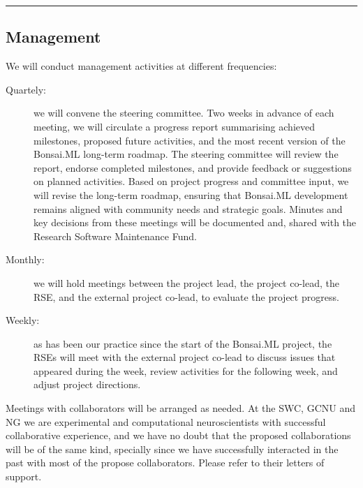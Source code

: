 \noindent\rule{\textwidth}{1pt}
\subsection{Management}

We will conduct management activities at different frequencies:

\begin{description}

    \item[Quartely:] we will convene the steering committee. Two weeks in
        advance of each meeting, we will circulate a progress report
        summarising achieved milestones, proposed future activities, and the
        most recent version of the Bonsai.ML long-term roadmap.
        The steering committee will review the report, endorse completed
        milestones, and provide feedback or suggestions on planned activities.
        Based on project progress and committee input, we will revise the
        long-term roadmap, ensuring that Bonsai.ML development remains aligned
        with community needs and strategic goals.
        Minutes and key decisions from these meetings will be documented and,
        shared with the Research Software Maintenance Fund.

    \item[Monthly:] we will hold meetings between the project lead, the
        project co-lead, the RSE, and the external project co-lead, to evaluate
        the project progress.

    \item[Weekly:] as has been our practice since the start of the Bonsai.ML
        project, the RSEs will meet with the external project co-lead to
        discuss issues that appeared during the week, review activities for the
        following week, and adjust project directions.

\end{description}

Meetings with collaborators will be arranged as needed.
%
At the SWC, GCNU and NG we are experimental and computational neuroscientists
with successful collaborative experience, and we have no doubt that the
proposed collaborations will be of the same kind,
%
specially since we have successfully interacted in the past with most of the
propose collaborators.
%
Please refer to their letters of support.
